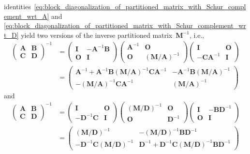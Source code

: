 \documentclass[12pt,a4paper]{article}
\begin{document}
identities~\eqref{eq:block_diagonalization_of_partitioned_matrix_with_Schur_complement_wrt_A}
and \eqref{eq:block_diagonalization_of_partitioned_matrix_with_Schur_complement_wrt_D} yield
two versions of the inverse partitioned matrix~$\mathbf{M}^{-1}$, i.e.,
\begin{align}
\begin{pmatrix}
\mathbf{A} & \mathbf{B} \\
\mathbf{C} & \mathbf{D}
\end{pmatrix}^{-1}
&=
\begin{pmatrix}
\mathbf{I} & -\mathbf{A}^{-1}\mathbf{B} \\
\mathbf{O} & \mathbf{I}
\end{pmatrix}
\begin{pmatrix}
\mathbf{A}^{-1} & \mathbf{O} \\
\mathbf{O} & \left(\mathbf{M}/\mathbf{A}\right)^{-1}
\end{pmatrix}
\begin{pmatrix}
\mathbf{I} & \mathbf{O} \\
-\mathbf{C}\mathbf{A}^{-1} & \mathbf{I}
\end{pmatrix} \\
&=
\begin{pmatrix}
\mathbf{A}^{-1} +
\mathbf{A}^{-1}\mathbf{B} \left(\mathbf{M}/\mathbf{A}\right)^{-1} \mathbf{C}\mathbf{A}^{-1} &
-\mathbf{A}^{-1}\mathbf{B} \left(\mathbf{M}/\mathbf{A}\right)^{-1} \\
-\left(\mathbf{M}/\mathbf{A}\right)^{-1} \mathbf{C}\mathbf{A}^{-1} &
\left(\mathbf{M}/\mathbf{A}\right)^{-1}
\end{pmatrix}
\end{align}
and
\begin{align}
\begin{pmatrix}
\mathbf{A} & \mathbf{B} \\
\mathbf{C} & \mathbf{D}
\end{pmatrix}^{-1}
&=
\begin{pmatrix}
\mathbf{I} & \mathbf{O} \\
-\mathbf{D}^{-1}\mathbf{C} & \mathbf{I}
\end{pmatrix}
\begin{pmatrix}
\left(\mathbf{M}/\mathbf{D}\right)^{-1} & \mathbf{O} \\
\mathbf{O} & \mathbf{D}^{-1}
\end{pmatrix}
\begin{pmatrix}
\mathbf{I} & -\mathbf{B}\mathbf{D}^{-1} \\
\mathbf{O} & \mathbf{I}
\end{pmatrix} \\
&=
\begin{pmatrix}
\left(\mathbf{M}/\mathbf{D}\right)^{-1} &
-\left(\mathbf{M}/\mathbf{D}\right)^{-1} \mathbf{B}\mathbf{D}^{-1} \\
-\mathbf{D}^{-1}\mathbf{C} \left(\mathbf{M}/\mathbf{D}\right)^{-1} &
\mathbf{D}^{-1} +
\mathbf{D}^{-1}\mathbf{C} \left(\mathbf{M}/\mathbf{D}\right)^{-1} \mathbf{B}\mathbf{D}^{-1}
\end{pmatrix}
\end{align}
\end{document}
